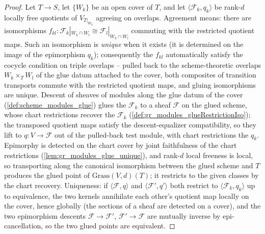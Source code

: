 \begin{proof}\leanok
  Let \(T \to S\), let \(\{W_k\}\) be an open cover of \(T\), and let
  \(\langle \mathcal{F}_k, q_k \rangle\) be rank-\(d\) locally free
  quotients of \(V_{T|_{W_k}}\) agreeing on overlaps.  Agreement means:
  there are isomorphisms
  \(f_{kl} : \mathcal{F}_k|_{W_k \cap W_l} \cong \mathcal{F}_l|_{W_k \cap W_l}\)
  commuting with the restricted quotient maps.  Such an isomorphism is
  \emph{unique} when it exists (it is determined on the image of the
  epimorphism \(q_k\)); consequently the \(f_{kl}\) automatically satisfy
  the cocycle condition on triple overlaps -- pulled back to the
  scheme-theoretic overlaps \(W_k \times_T W_l\) of the glue datum attached
  to the cover, both composites of transition transports commute with the
  restricted quotient maps, and gluing isomorphisms are unique.  Descent of
  sheaves of modules along the glue datum of the cover
  (\cref{def:scheme_modules_glue}) glues the \(\mathcal{F}_k\) to a sheaf
  \(\mathcal{F}\) on the glued scheme, whose chart restrictions recover the
  \(\mathcal{F}_k\) (\cref{def:gr_modules_glueRestrictionIso}); the
  transposed quotient maps satisfy the descent-equalizer compatibility, so
  they lift to \(q : V \to \mathcal{F}\) out of the pulled-back test module,
  with chart restrictions the \(q_k\).  Epimorphy is detected on the chart
  cover by joint faithfulness of the chart restrictions
  (\cref{lem:gr_modules_glue_unique}), and rank-\(d\) local freeness is
  local, so transporting along the canonical isomorphism between the glued
  scheme and \(T\) produces the glued point of
  \(\mathrm{Grass}(V,d)(T)\); it restricts to the given classes by the
  chart recovery.  Uniqueness: if \(\langle \mathcal{F}, q \rangle\) and
  \(\langle \mathcal{F}', q' \rangle\) both restrict to
  \(\langle \mathcal{F}_k, q_k \rangle\) up to equivalence, the two kernels
  annihilate each other's quotient map locally on the cover, hence globally
  (the sections of a sheaf are detected on a cover), and the two
  epimorphism descents \(\mathcal{F} \to \mathcal{F}'\),
  \(\mathcal{F}' \to \mathcal{F}\) are mutually inverse by
  epi-cancellation, so the two glued points are equivalent.
\end{proof}

